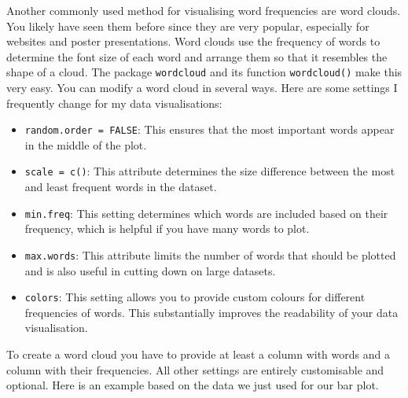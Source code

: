 \documentclass[
  letterpaper,
]{krantz}
\begin{document}
Another commonly used method for visualising word frequencies are word
clouds. You likely have seen them before since they are very popular,
especially for websites and poster presentations. Word clouds use the
frequency of words to determine the font size of each word and arrange
them so that it resembles the shape of a cloud. The package
\texttt{wordcloud} and its function \texttt{wordcloud()} make this very
easy. You can modify a word cloud in several ways. Here are some
settings I frequently change for my data visualisations:

\begin{itemize}
\item
  \texttt{random.order\ =\ FALSE}: This ensures that the most important
  words appear in the middle of the plot.
\item
  \texttt{scale\ =\ c()}: This attribute determines the size difference
  between the most and least frequent words in the dataset.
\item
  \texttt{min.freq}: This setting determines which words are included
  based on their frequency, which is helpful if you have many words to
  plot.
\item
  \texttt{max.words}: This attribute limits the number of words that
  should be plotted and is also useful in cutting down on large
  datasets.
\item
  \texttt{colors}: This setting allows you to provide custom colours for
  different frequencies of words. This substantially improves the
  readability of your data visualisation.
\end{itemize}

To create a word cloud you have to provide at least a column with words
and a column with their frequencies. All other settings are entirely
customisable and optional. Here is an example based on the data we just
used for our bar plot.
\end{document}
